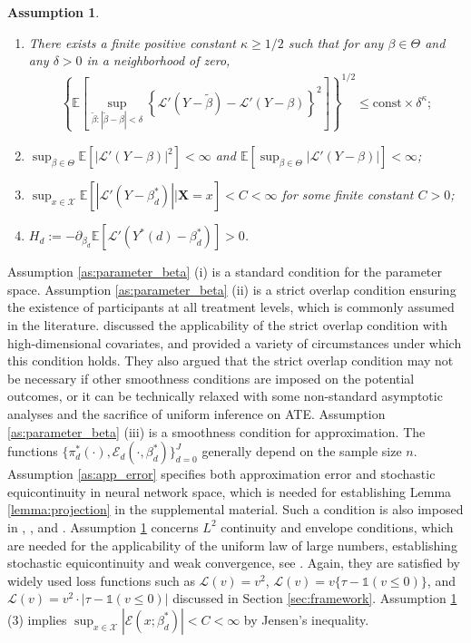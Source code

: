 \documentclass[11pt]{article}
\newtheorem{assumption}[]{Assumption}
\numberwithin{equation}{section}
\begin{document}
\begin{assumption}\label{as:L2_continuous} \
	\begin{enumerate}
		\item  There exists a finite positive constant $\kappa\geq 1/2$ such that  for any $\beta\in \Theta$ and any $\delta>0$ in a neighborhood of zero,
		\begin{align*}
			\left\{\mathbb{E}\left[\sup_{\widetilde{\beta}:|\widetilde{\beta}-\beta|<\delta}\left\{\mathcal{L}'(Y-\widetilde{\beta})-\mathcal{L}'(Y-{\beta})\right\}^2\right]\right\}^{1/2}\leq \text{const}\times \delta^{\kappa};
		\end{align*}
		\item $\sup_{\beta\in \Theta}\mathbb{E}\left[|\mathcal{L}'(Y-{\beta})|^2\right]<\infty$ and $\mathbb{E}\left[\sup_{\beta\in \Theta}|\mathcal{L}'(Y-{\beta})|\right]<\infty$;
		\item $\sup_{x\in\mathcal{X}}\mathbb{E}\left[|\mathcal{L}'(Y-{\beta}^*_d)||\boldsymbol{X}=x\right]<C<\infty$ for some finite constant $C>0$;
		\item $H_d:=-\partial_{\beta_d}\mathbb{E}[\mathcal{L}'(Y^*(d)-\beta_d^*)]>0$.
	\end{enumerate}	
\end{assumption}
Assumption \ref{as:parameter_beta} (i) is a standard condition for the parameter space. Assumption \ref{as:parameter_beta} (ii) is a strict overlap condition ensuring the existence of participants at all treatment levels, which is commonly assumed in the literature. \cite{DDFLS21} discussed the applicability of the strict overlap condition with high-dimensional covariates, and provided a variety of circumstances under which this condition holds. They also argued that the strict overlap condition may not be necessary if other smoothness conditions are imposed on the potential outcomes, or it can be technically relaxed with some non-standard
asymptotic analyses \citep[e.g.][]{hong2020inference,ma2020robust} and the sacrifice of  uniform
inference on ATE. Assumption \ref{as:parameter_beta} (iii) is a smoothness condition for approximation. The functions $\{\pi_{d}^*(\cdot),\mathcal{E}_d(\cdot,\beta_d^*)\}_{d=0}^J$ generally depend on the sample size $n$.   Assumption \ref{as:app_error} specifies both approximation error and stochastic equicontinuity in neural network space, which is needed for establishing Lemma \ref{lemma:projection} in the supplemental material. Such a condition is also imposed in  \citet[Condition (C)]{shen1997methods},  \citet[Condition (B.3)]{chen1998sieve},  and \citet[Assumption 3.3 (ii)]{chen2015sieve}.   Assumption \ref{as:L2_continuous} concerns $L^2$ continuity and envelope conditions, which are needed for the applicability of the uniform
law of large numbers,
establishing stochastic equicontinuity and weak convergence, see \cite{chen2008semiparametric}. Again, they are
satisfied by widely used loss functions such as $\mathcal{L}(v)=v^2$, $\mathcal{L}(v)=v\{\tau-\mathds{1}(v\leq 0) \}$, and $\mathcal{L}(v)=v^2\cdot |\tau-\mathds{1}(v\leq 0)|$ discussed in Section \ref{sec:framework}. Assumption \ref{as:L2_continuous} (3) implies $\sup_{x\in\mathcal{X}}|\mathcal{E}(x;\beta_d^*)|<C<\infty$ by Jensen's inequality.
\end{document}
